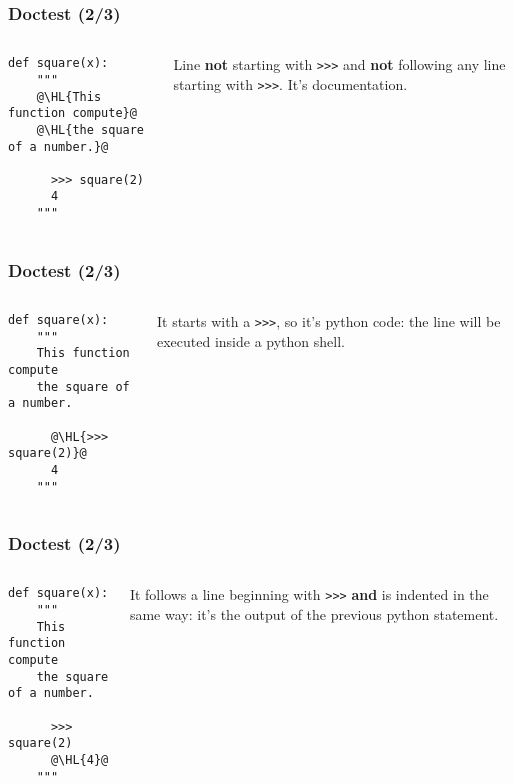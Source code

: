 \documentclass[english,serif,mathserif,xcolor=pdftex,dvipsnames,table]{beamer}
\begin{document}
\begin{frame}[fragile]
  \frametitle{Doctest (2/3)}
  \begin{columns}[t]
    \begin{column}{0.6\textwidth}
  \begin{lstlisting}
def square(x):
    """
    @\HL{This function compute}@
    @\HL{the square of a number.}@

      >>> square(2)
      4
    """
  \end{lstlisting}
\end{column}
\begin{column}{0.4\textwidth}
  Line \textbf{not} starting with \texttt{>>>} and \textbf{not}
  following any line starting with \texttt{>>>}. It's documentation.
\end{column}
\end{columns}
\end{frame}

\begin{frame}[fragile]
  \frametitle{Doctest (2/3)}
\begin{columns}[t]
  \begin{column}{0.6\textwidth}
  \begin{lstlisting}
def square(x):
    """
    This function compute
    the square of a number.

      @\HL{>>> square(2)}@
      4
    """
  \end{lstlisting}
\end{column}
\begin{column}{0.4\textwidth}
  It starts with a \texttt{>>>}, so it's python code: the line will be
  executed inside a python shell.
\end{column}
\end{columns}
\end{frame}

\begin{frame}[fragile]
  \frametitle{Doctest (2/3)}
\begin{columns}[t]
  \begin{column}{0.6\textwidth}
  \begin{lstlisting}
def square(x):
    """
    This function compute
    the square of a number.

      >>> square(2)
      @\HL{4}@
    """
  \end{lstlisting}
\end{column}
\begin{column}{0.4\textwidth}
  It follows a line beginning with \texttt{>>>} \textbf{and} is
  indented in the same way: it's the output of the previous python
  statement.
\end{column}
\end{columns}
\end{frame}
\end{document}

